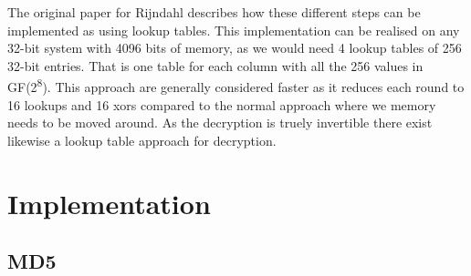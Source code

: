 \documentclass[a4paper]{article}
\begin{document}
The original paper for Rijndahl describes how these different steps can be implemented as using lookup tables. This implementation can be realised on any 32-bit system with 4096 bits of memory, as we would need 4 lookup tables of 256 32-bit entries. That is one table for each column with all the 256 values in GF(2\textsuperscript{8}). This approach are generally considered faster as it reduces each round to 16 lookups and 16 xors compared to the normal approach where we memory needs to be moved around. As the decryption is truely invertible there exist likewise a lookup table approach for decryption.

\section{Implementation}
\label{sec:org9f2812a}
\subsection{MD5}
\label{sec:orgfffcf05}
\end{document}
